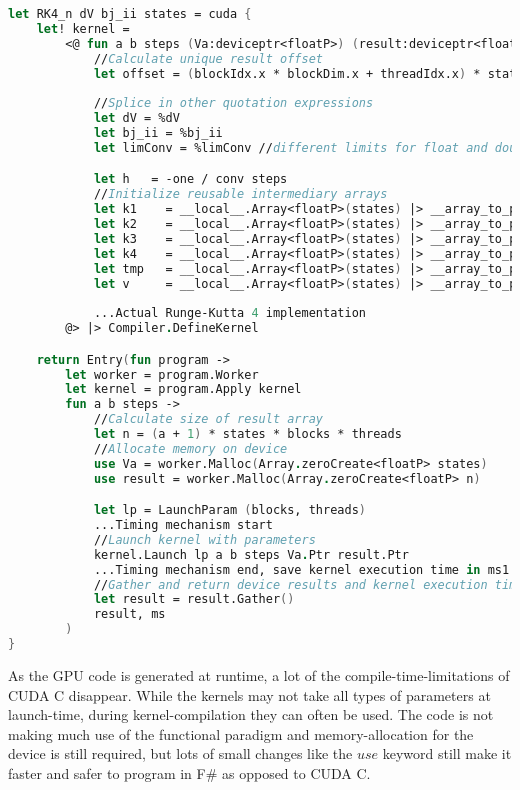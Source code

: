 \begin{lstlisting}[language=FSharp, caption=The Runge-Kutta 4 solver expressed in F\# Alea.cuBase, label=cubase_rk4_n_snippet]
let RK4_n dV bj_ii states = cuda {
	let! kernel =
		<@ fun a b steps (Va:deviceptr<floatP>) (result:deviceptr<floatP>) ->
			//Calculate unique result offset
			let offset = (blockIdx.x * blockDim.x + threadIdx.x) * states * (a + 1)
            
			//Splice in other quotation expressions
			let dV = %dV
			let bj_ii = %bj_ii
			let limConv = %limConv //different limits for float and double

			let h   = -one / conv steps
			//Initialize reusable intermediary arrays
			let k1	  = __local__.Array<floatP>(states) |> __array_to_ptr
			let k2	  = __local__.Array<floatP>(states) |> __array_to_ptr
			let k3	  = __local__.Array<floatP>(states) |> __array_to_ptr
			let k4	  = __local__.Array<floatP>(states) |> __array_to_ptr
			let tmp	  = __local__.Array<floatP>(states) |> __array_to_ptr
			let v	  = __local__.Array<floatP>(states) |> __array_to_ptr
            
            ...Actual Runge-Kutta 4 implementation
        @> |> Compiler.DefineKernel 

    return Entry(fun program ->
        let worker = program.Worker
        let kernel = program.Apply kernel
        fun a b steps ->
            //Calculate size of result array
            let n = (a + 1) * states * blocks * threads
            //Allocate memory on device
            use Va = worker.Malloc(Array.zeroCreate<floatP> states)
            use result = worker.Malloc(Array.zeroCreate<floatP> n)

            let lp = LaunchParam (blocks, threads)
            ...Timing mechanism start
            //Launch kernel with parameters
            kernel.Launch lp a b steps Va.Ptr result.Ptr
            ...Timing mechanism end, save kernel execution time in ms1
            //Gather and return device results and kernel execution time
            let result = result.Gather()
            result, ms
        )
}
\end{lstlisting}

As the GPU code is generated at runtime, a lot of the compile-time-limitations of CUDA C disappear.
While the kernels may not take all types of parameters at launch-time, during kernel-compilation they can often be used.
The code is not making much use of the functional paradigm and memory-allocation for the device is still required, but lots of small changes like the $use$ keyword still make it faster and safer to program in F\# as opposed to CUDA C.

